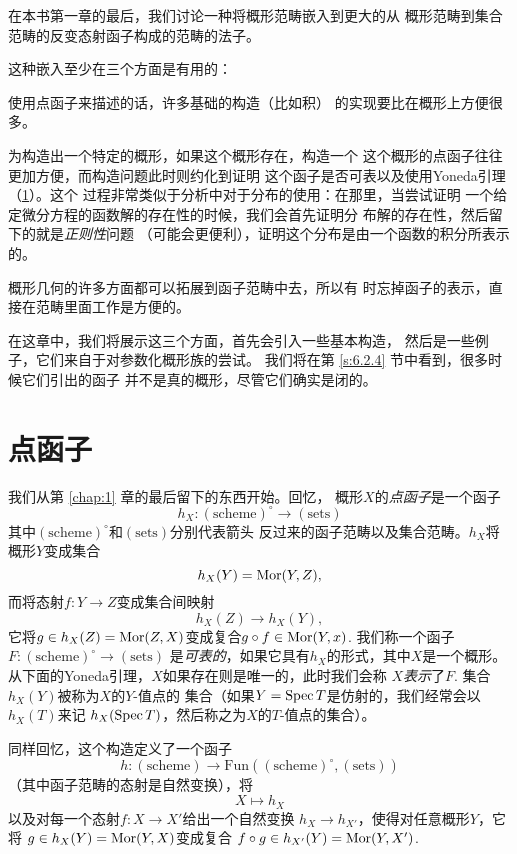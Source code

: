 在本书第一章的最后，我们讨论一种将概形范畴嵌入到更大的从
概形范畴到集合范畴的反变态射函子构成的范畴的法子。

这种嵌入至少在三个方面是有用的：

\begin{compactenum}[(1)]
\item 使用点函子来描述的话，许多基础的构造（比如积）
的实现要比在概形上方便很多。
\item 为构造出一个特定的概形，如果这个概形存在，构造一个
这个概形的点函子往往更加方便，而构造问题此时则约化到证明
这个函子是否可表以及使用Yoneda引理（\ref{s:6.1}）。这个
过程非常类似于分析中对于分布的使用：在那里，当尝试证明
一个给定微分方程的函数解的存在性的时候，我们会首先证明分
布解的存在性，然后留下的就是\textit{正则性}问题
（可能会更便利），证明这个分布是由一个函数的积分所表示的。
\item 概形几何的许多方面都可以拓展到函子范畴中去，所以有
时忘掉函子的表示，直接在范畴里面工作是方便的。
\end{compactenum}

在这章中，我们将展示这三个方面，首先会引入一些基本构造，
然后是一些例子，它们来自于对参数化概形族的尝试。
我们将在第 \ref{s:6.2.4} 节中看到，很多时候它们引出的函子
并不是真的概形，尽管它们确实是闭的。

\section{点函子}\label{s:6.1}

我们从第 \ref{chap:1} 章的最后留下的东西开始。回忆，
概形$X$的\textit{点函子}是一个函子
\[
	h_X:(\text{scheme})^\circ \to (\text{sets})
\]
其中$(\text{scheme})^\circ$和$(\text{sets})$分别代表箭头
反过来的函子范畴以及集合范畴。$h_X$将概形$Y$变成集合
\[
	h_X(Y)=\operatorname{Mor}(Y,Z),
\]
而将态射$f:Y\to Z$变成集合间映射
\[
	h_X(Z)\to h_X(Y),
\]
它将$g\in h_X(Z)=\operatorname{Mor}(Z,X)$变成复合$g\circ f\in \operatorname{Mor}(Y,x)$.
我们称一个函子$F:(\text{scheme})^\circ \to (\text{sets})$
是\textit{可表的}，如果它具有$h_X$的形式，其中$X$是一个概形。
从下面的Yoneda引理，$X$如果存在则是唯一的，此时我们会称
$X$\textit{表示}了$F$. 集合$h_X(Y)$被称为$X$的$Y$-值点的
集合（如果$Y=\operatorname{Spec} T$是仿射的，我们经常会以$h_X(T)$来记
$h_X(\operatorname{Spec} T)$，然后称之为$X$的$T$-值点的集合）。

同样回忆，这个构造定义了一个函子
\[
	h:(\text{scheme})\to \mathrm{Fun}
	((\text{scheme})^\circ ,(\text{sets}))
\]
（其中函子范畴的态射是自然变换），将
\[
	X\mapsto h_X
\]
以及对每一个态射$f:X\to X'$给出一个自然变换
$h_X\to h_{X'}$，使得对任意概形$Y$，它将
$g\in h_X(Y)=\operatorname{Mor}(Y,X)$变成复合
$f\circ g\in h_{X'}(Y)=\operatorname{Mor}(Y,X')$.

